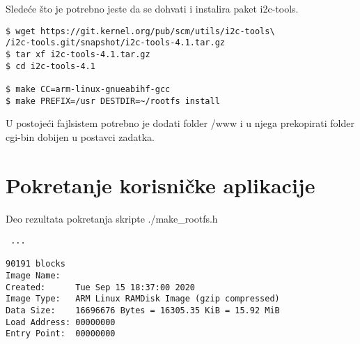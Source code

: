 \documentclass{article}
\begin{document}
Sledeće što je potrebno jeste da se dohvati i instalira paket i2c-tools. \\


\begin{commandline}
  \begin{verbatim}
$ wget https://git.kernel.org/pub/scm/utils/i2c-tools\
/i2c-tools.git/snapshot/i2c-tools-4.1.tar.gz
$ tar xf i2c-tools-4.1.tar.gz
$ cd i2c-tools-4.1

$ make CC=arm-linux-gnueabihf-gcc
$ make PREFIX=/usr DESTDIR=~/rootfs install
  \end{verbatim}
\end{commandline}


U postojeći fajlsistem potrebno je dodati folder /www i u njega prekopirati folder cgi-bin dobijen u postavci zadatka.


\section{Pokretanje korisničke aplikacije}






Deo rezultata pokretanja skripte  ./make\_rootfs.h 

\begin{commandline}
  \begin{verbatim}
 ...

90191 blocks
Image Name:   
Created:      Tue Sep 15 18:37:00 2020
Image Type:   ARM Linux RAMDisk Image (gzip compressed)
Data Size:    16696676 Bytes = 16305.35 KiB = 15.92 MiB
Load Address: 00000000
Entry Point:  00000000
  \end{verbatim}
\end{commandline}
\end{document}
